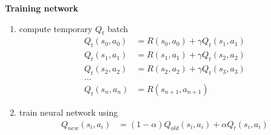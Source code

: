 \documentclass[xcolor=dvipsnames]{beamer}
\begin{document}
\begin{frame}{\bf Training network}

\begin{enumerate}
\item compute temporary $Q_t$ batch
      \begin{align*}
        Q_t (s_0, a_0) &= R(s_0, a_0) + \gamma Q_t(s_1, a_1) \\
        Q_t(s_1, a_1) &= R(s_1, a_1) + \gamma Q_t(s_2, a_2) \\
        Q_t(s_2, a_2) &= R(s_2, a_2) + \gamma Q_t(s_3, a_3) \\
        ... \\
        Q_t(s_n, a_n) &= R(s_{n+1}, a_{n+1})
      \end{align*}

\item train neural network using
      \begin{align*}
        Q_{new}(s_i, a_i) &= (1 - \alpha)Q_{old}(s_i, a_i) + \alpha Q_t(s_i, a_i)
      \end{align*}

\end{enumerate}


\end{frame}
\end{document}
